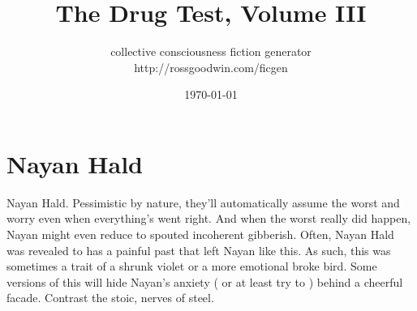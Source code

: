 \documentclass[12pt]{book}
\title{The Drug Test, Volume III}
\author{collective consciousness fiction generator\\http://rossgoodwin.com/ficgen}
\date{\today}
\begin{document}
\maketitle



\chapter{Nayan Hald}

Nayan Hald. Pessimistic by nature, they'll automatically assume the worst and worry even when everything's went right. And when the worst really did happen, Nayan might even reduce to spouted incoherent gibberish. Often, Nayan Hald was revealed to has a painful past that left Nayan like this. As such, this was sometimes a trait of a shrunk violet or a more emotional broke bird. Some versions of this will hide Nayan's anxiety ( or at least try to ) behind a cheerful facade. Contrast the stoic, nerves of steel.
\end{document}
